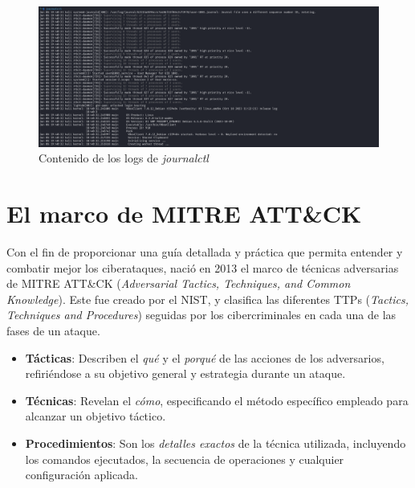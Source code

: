 \begin{figure}[H]
    \centering
    \includegraphics[width=1\linewidth]{imagenes/journalctl.png}
    \caption{Contenido de los logs de \textit{journalctl}}
    \label{fig:journalctl}
\end{figure}


\newpage


\section{El marco de MITRE ATT\&CK}

Con el fin de proporcionar una guía detallada y práctica que permita entender y combatir mejor los ciberataques, nació en 2013 \cite{10005490} el marco de técnicas adversarias de MITRE \gls{ATT&CK} (\textit{Adversarial Tactics, Techniques, and Common Knowledge}). Este fue creado por el \gls{NIST}, y clasifica las diferentes \gls{TTP}s (\textit{Tactics, Techniques and Procedures}) seguidas por los cibercriminales en cada una de las fases de un ataque.

\vspace{-1mm}

\begin{itemize}
    \item \textbf{Tácticas}: Describen el \textit{qué} y el \textit{porqué} de las acciones de los adversarios, refiriéndose a su objetivo general y estrategia durante un ataque.
    \item \textbf{Técnicas}: Revelan el \textit{cómo}, especificando el método específico empleado para alcanzar un objetivo táctico.
    \item \textbf{Procedimientos}: Son los \textit{detalles exactos} de la técnica utilizada, incluyendo los comandos ejecutados, la secuencia de operaciones y cualquier configuración aplicada.
\end{itemize}

